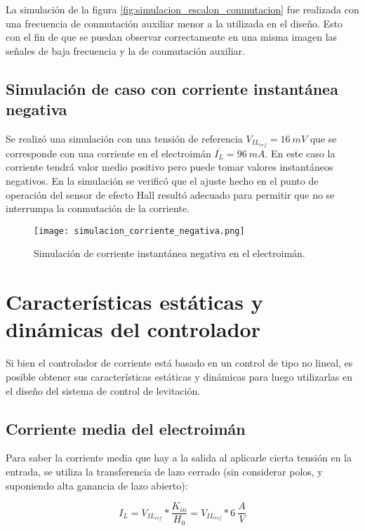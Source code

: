 La simulación de la figura \ref{fig:simulacion_escalon_conmutacion} fue realizada con una frecuencia de conmutación auxiliar menor a la utilizada en el diseño. Esto con el fin de que se puedan observar correctamente en una misma imagen las señales de baja frecuencia y la de conmutación auxiliar.

\subsection{Simulación de caso con corriente instantánea negativa}

Se realizó una simulación con una tensión de referencia $V_{IL_{ref}}=16\:mV$ que se corresponde con una corriente en el electroimán $\overline{I_L}=96\:mA$. En este caso la corriente tendrá valor medio positivo pero puede tomar valores instantáneos negativos. En la simulación se verificó que el ajuste hecho en el punto de operación del sensor de efecto Hall resultó adecuado para permitir que no se interrumpa la conmutación de la corriente.

\begin{figure}[H]
	\centering
	\texttt{[image: simulacion\_corriente\_negativa.png]}
	\caption{Simulación de corriente instantánea negativa en el electroimán.}
	\label{fig:simulacion_corriente_negativa}
\end{figure}



\section{Características estáticas y dinámicas del controlador}

Si bien el controlador de corriente está basado en un control de tipo no lineal, es posible obtener sus características estáticas y dinámicas para luego utilizarlas en el diseño del sistema de control de levitación.

\subsection{Corriente media del electroimán}

\noindent Para saber la corriente media que hay a la salida al aplicarle cierta tensión en la entrada, se utiliza la transferencia de lazo cerrado (sin considerar polos, y suponiendo alta ganancia de lazo abierto):

\begin{equation} 
I_L = V_{IL_{ref}} * \frac{K_{in}}{H_0} = V_{IL_{ref}} * 6\:\frac{A}{V}
\end{equation}

